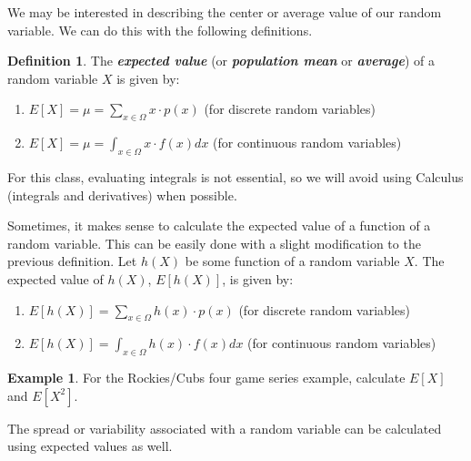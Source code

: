 \documentclass[
  11pt,
]{book}
\theoremstyle{definition}
\newtheorem{definition}{Definition}[chapter]
\theoremstyle{definition}
\newtheorem{example}{Example}[chapter]
\theoremstyle{definition}
\theoremstyle{definition}
\theoremstyle{remark}
\begin{document}
\hfill\break
\hfill\break
\hfill\break
\hfill\break
\hfill\break

We may be interested in describing the center or average value of our random variable. We can do this with the following definitions.

\begin{definition}

The \textbf{\emph{expected value}} (or \textbf{\emph{population mean}} or \textbf{\emph{average}}) of a random variable \(X\) is given by:\\

\begin{enumerate}
\def\labelenumi{(\roman{enumi})}
\item
  \(E[X] = \mu = \sum_{x \in \Omega} x \cdot p(x)\) (for discrete random variables)
\item
  \(E[X] = \mu = \int_{x \in \Omega} x \cdot f(x) dx\) (for continuous random variables)
\end{enumerate}

\end{definition}

For this class, evaluating integrals is not essential, so we will avoid using Calculus (integrals and derivatives) when possible.

Sometimes, it makes sense to calculate the expected value of a function of a random variable. This can be easily done with a slight modification to the previous definition. Let \(h(X)\) be some function of a random variable \(X\). The expected value of \(h(X)\), \(E[h(X)]\), is given by:

\begin{enumerate}
\def\labelenumi{(\roman{enumi})}
\item
  \(E[h(X)] = \sum_{x \in \Omega} h(x) \cdot p(x)\) (for discrete random variables)
\item
  \(E[h(X)] = \int_{x \in \Omega} h(x) \cdot f(x) dx\) (for continuous random variables)
\end{enumerate}

\begin{example}
For the Rockies/Cubs four game series example, calculate \(E[X]\) and \(E[X^2]\).
\end{example}

\hfill\break
\hfill\break
\hfill\break
\hfill\break
\hfill\break

The spread or variability associated with a random variable can be calculated using expected values as well.
\end{document}
